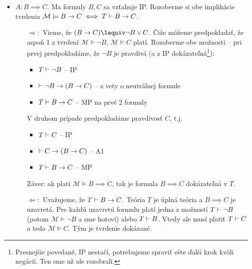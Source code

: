 \begin{dokaz}
\begin{itemize}
\begin{itemize}
        \item $A: B \implies C$. Ma formuly $B,C$ sa vzťahuje IP.
            Rozoberme si obe implikácie tvrdenia
            $\mathcal{M} \models B \rightarrow C \iff
             T \vdash B \rightarrow C$.
            \begin{itemize}
            \item[$\Rightarrow:$] Vieme, že $(B \implies C)
                    \lequiv \neg B \lor C$. Čiže môžeme
                    predpokladať, že aspoň 1 z tvrdení 
                    $\mathcal{M} \models \neg B$,
                    $\mathcal{M} \models C$ platí. Rozoberme obe
                    možnosti -- pri prvej predpokladáme, že $\neg B$ je
                    pravdivá (a z IP dokázateľná\footnote{
                        Presnejšie povedané, IP nestačí, potrebujeme
                        spraviť ešte ďalší krok kvôli negácii.
                        Ten sme už ale rozobrali.}):
                    \begin{itemize}
                    \item $T \vdash \neg B$ -- IP
                    \item $\vdash \neg B \rightarrow (B \rightarrow C)$ --
                        z vety o neutrálnej formule
                    \item $T \vdash B \rightarrow C$ -- MP na prvé 2
                        formuly
                    \end{itemize}
                    V druhom prípade predpokladáme pravdivosť $C$,
                    t.j.
                    \begin{itemize}
                    \item $T \vdash C$ -- IP
                    \item $\vdash C \rightarrow (B \rightarrow C)$ -- A1
                    \item $T \vdash B \rightarrow C$ -- MP
                    \end{itemize}
                    Záver: ak platí
                    $\mathcal{M} \models B \implies C$, tak je formula
                    $B \implies C$ dokázateľná v $T$.
            \smallskip
            \item[$\Leftarrow:$] Uvažujeme, že
                $T \vdash B \rightarrow C$.
                Teória $T$ je úplná teória a $B \implies C$ je uzavretá.
                Pre každú uzavretú formulu platí jedna z možností
                $T \vdash \neg B$ (potom $\mathcal{M} \models \neg B$ a sme
                hotoví) alebo $T \vdash B$.
                Vtedy ale musí platiť $T \vdash C$
                a teda $\mathcal{M} \models C$. Tým je tvrdenie dokázané.


\end{itemize}
\end{itemize}
\end{itemize}
\end{dokaz}
